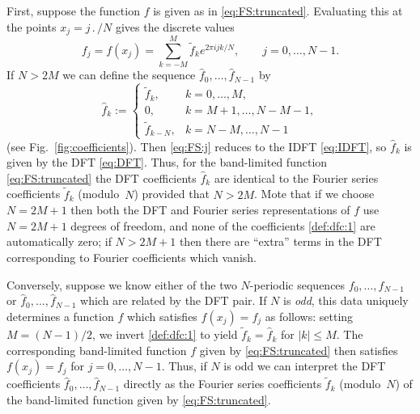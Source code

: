 \documentclass[12pt]{article}
\newcommand{\abs}[1]{\left|{#1}\right|}
\newcommand{\fc}[1]{\widetilde{#1}} %
\newcommand{\dfc}[1]{\widehat{#1}}  %
\begin{document}
First, suppose the function $f$ is given as in \eqref{eq:FS:truncated}.
Evaluating this at the points $x_j=j\period/N$ gives the discrete values
\begin{equation}
   f_j = f(x_j) = \sum_{k=-M}^{M} \fc{f}_k e^{2\pi ijk/N},
\qquad j=0,\dots,N-1 .
\label{eq:FS:j}
\end{equation}
If $N>2M$ we can define the sequence $\dfc{f}_0,\dots,\dfc{f}_{N-1}$ by
\begin{equation}
   \dfc{f}_k := \begin{cases} 
      \fc{f}_k,     & \text{$k=0,\dots,M$}, \\
      0,            & \text{$k=M+1,\dots,N-M-1$}, \\
      \fc{f}_{k-N}, & \text{$k=N-M,\dots,N-1$}
   \end{cases}
\label{def:dfc:1}
\end{equation}
(see Fig.~\ref{fig:coefficients}).
Then \eqref{eq:FS:j} reduces to the IDFT \eqref{eq:IDFT}, so $\dfc{f}_k$ is
given by the DFT \eqref{eq:DFT}.  Thus, for the band-limited function
\eqref{eq:FS:truncated} the DFT coefficients $\dfc{f}_k$ are identical to the
Fourier series coefficients $\fc{f}_k$ (modulo~$N$) provided that $N>2M$. 
Mote that if we choose $N=2M+1$ then both the DFT and Fourier series
representations of $f$ use $N=2M+1$ degrees of freedom, and none of the 
coefficients \eqref{def:dfc:1} are automatically zero; if $N>2M+1$ then there
are ``extra'' terms in the DFT corresponding to Fourier coefficients which
vanish.

Conversely, suppose we know either of the two $N$-periodic sequences
$f_0,\dots,f_{N-1}$ or $\dfc{f}_0,\dots,\dfc{f}_{N-1}$ which are related by
the DFT pair.  If $N$ is \emph{odd}, this data uniquely determines a function
$f$ which satisfies $f(x_j)=f_j$ as follows:  setting $M=(N-1)/2$, we invert
\eqref{def:dfc:1} to yield $\fc{f}_k = \dfc{f}_k$ for $\abs{k}\le M$.  The
corresponding band-limited function $f$ given by \eqref{eq:FS:truncated} then
satisfies $f(x_j)=f_j$ for $j=0,\dots,N-1$.  Thus, if $N$ is odd we can
interpret the DFT coefficients $\dfc{f}_0,\dots,\dfc{f}_{N-1}$ directly as the
Fourier series coefficients $\fc{f}_k$ (modulo~$N$) of the band-limited
function given by \eqref{eq:FS:truncated}.
\end{document}
